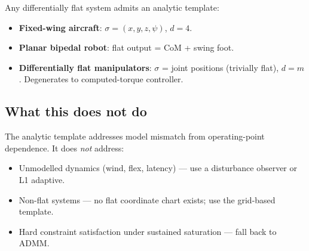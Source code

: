\documentclass[11pt]{article}
\begin{document}
Any differentially flat system admits
an analytic template:
\begin{itemize}[leftmargin=6mm]
  \item \textbf{Fixed-wing aircraft}:
    $\sigma = (x, y, z, \psi)$, $d = 4$.
  \item \textbf{Planar bipedal robot}:
    flat output = CoM + swing foot.
  \item \textbf{Differentially flat manipulators}:
    $\sigma$ = joint positions (trivially flat),
    $d = m$.
    Degenerates to computed-torque controller.
\end{itemize}

\subsection{What this does not do}

The analytic template addresses model mismatch
from operating-point dependence.
It does \emph{not} address:
\begin{itemize}[leftmargin=6mm]
  \item Unmodelled dynamics (wind, flex, latency)
    --- use a disturbance observer or L1 adaptive.
  \item Non-flat systems --- no flat coordinate
    chart exists; use the grid-based template.
  \item Hard constraint satisfaction under
    sustained saturation --- fall back to ADMM.
\end{itemize}


\end{document}
